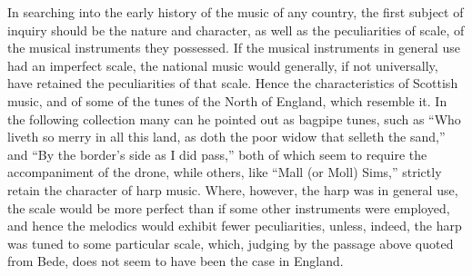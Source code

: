 \bigskip
\normalsize




In searching into the early history of the music of any country, the first
subject of inquiry should be the nature and character, as well as the peculiarities
of scale, of the musical instruments they possessed. If the musical instruments
in general use had an imperfect scale, the national music would generally, if not
universally, have retained the peculiarities of that scale. Hence the characteristics
of Scottish music, and of some of the tunes of the North of England, which resemble
it. In the following collection many can he pointed out as bagpipe tunes,
such as “Who liveth so merry in all this land, as doth the poor widow that selleth
the sand,” and “By the border’s side as I did pass,” both of which seem to
require the accompaniment of the drone, while others, like “Mall (or Moll)
Sims,” strictly retain the character of harp music. Where, however, the harp
was in general use, the scale would be more perfect than if some other instruments
were employed, and hence the melodics would exhibit fewer peculiarities,
unless, indeed, the harp was tuned to some particular scale, which, judging by
the passage above quoted from Bede, does not seem to have been the case in
England.


